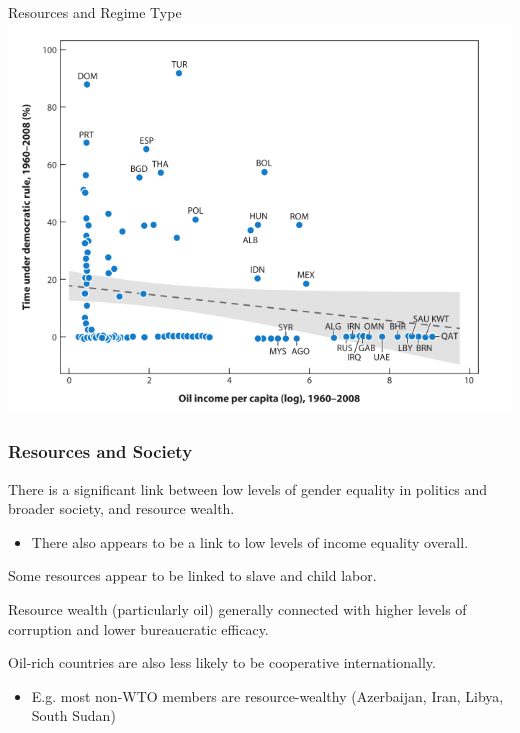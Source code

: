 \documentclass{beamer}
\begin{document}
\begin{frame}{\LARGE Resources and Regime Type}
	\centering
	\includegraphics[width=\textwidth,height=0.8\textheight,keepaspectratio]{regime type.png}
\end{frame}

\begin{frame} 
	\frametitle{\LARGE{Resources and Society}}
	\begin{itemize}
		\large{
			\item There is a significant link between low levels of gender equality in politics and broader society, and resource wealth. \pause
			\begin{itemize}
				\item There also appears to be a link to low levels of income equality overall. \pause
			\end{itemize}
			\item Some resources appear to be linked to slave and child labor. \pause
			\item Resource wealth (particularly oil) generally connected with higher levels of corruption and lower bureaucratic efficacy. \pause
			\item Oil-rich countries are also less likely to be cooperative internationally. \pause
			\begin{itemize}
				\item E.g. most non-WTO members are resource-wealthy (Azerbaijan, Iran, Libya, South Sudan)
			\end{itemize}
		}
	\end{itemize}
\end{frame}
\end{document}
